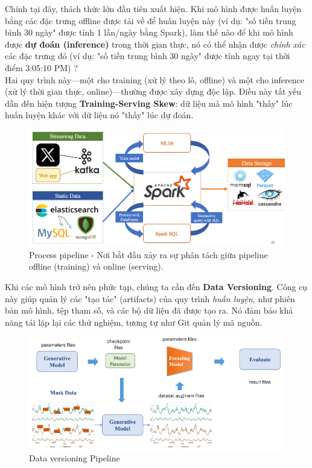 \documentclass[11pt]{article}
\begin{document}
Chính tại đây, thách thức lớn đầu tiên xuất hiện. Khi mô hình được huấn luyện bằng các đặc trưng offline được tải về để huấn luyện này (ví dụ: "số tiền trung bình 30 ngày" được tính 1 lần/ngày bằng Spark), làm thế nào để khi mô hình được \textbf{dự đoán (inference)} trong thời gian thực, nó có thể nhận được \textit{chính xác} các đặc trưng đó (ví dụ: "số tiền trung bình 30 ngày" được tính ngay tại thời điểm 3:05:10 PM) ? \\

Hai quy trình này—một cho training (xử lý theo lô, offline) và một cho inference (xử lý thời gian thực, online)—thường được xây dựng độc lập. Điều này tất yếu dẫn đến hiện tượng \textbf{Training-Serving Skew}: dữ liệu mà mô hình "thấy" lúc huấn luyện khác với dữ liệu nó "thấy" lúc dự đoán.

\begin{figure}[H]
    \centering
    \includegraphics[width=0.8\linewidth]{images/proces.png}
    \caption{Process pipeline - Nơi bắt đầu xảy ra sự phân tách giữa pipeline offline (training) và online (serving).}
\end{figure}

Khi các mô hình trở nên phức tạp, chúng ta cần đến \textbf{Data Versioning}. Công cụ này giúp quản lý các "tạo tác" (artifacts) của quy trình \textit{huấn luyện}, như phiên bản mô hình, tệp tham số, và các bộ dữ liệu đã được tạo ra. Nó đảm bảo khả năng tái lặp lại các thử nghiệm, tương tự như Git quản lý mã nguồn.

\begin{figure}[H]
    \centering
    \includegraphics[width=0.8\linewidth]{images/dt_ver.png}
    \caption{Data versioning Pipeline}
\end{figure}
\end{document}
